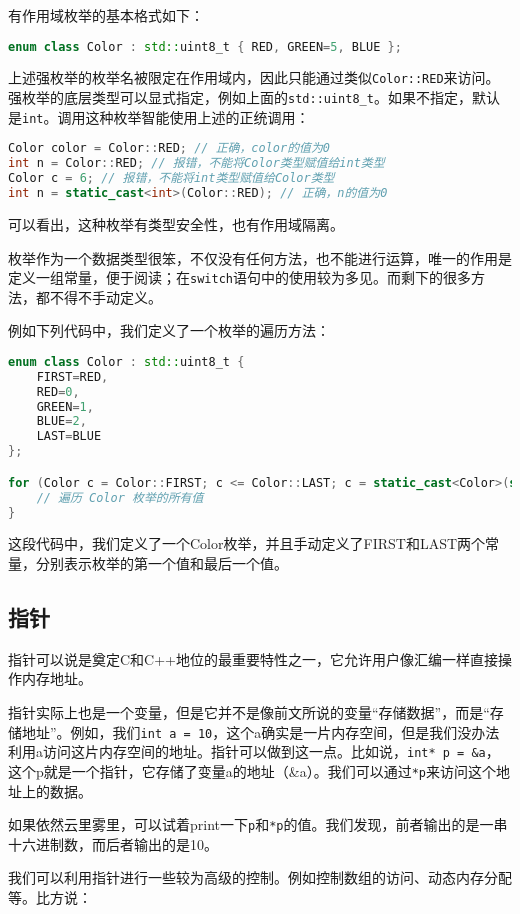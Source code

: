 \documentclass[../main.tex]{subfiles}
\begin{document}
有作用域枚举的基本格式如下：
\begin{lstlisting}[language=C++]
    enum class Color : std::uint8_t { RED, GREEN=5, BLUE };
\end{lstlisting}
上述强枚举的枚举名被限定在作用域内，因此只能通过类似\texttt{Color::RED}来访问。强枚举的底层类型可以显式指定，例如上面的\texttt{std::uint8\_t}。如果不指定，默认是\texttt{int}。调用这种枚举智能使用上述的正统调用：
\begin{lstlisting}[language=C++]
Color color = Color::RED; // 正确，color的值为0
int n = Color::RED; // 报错，不能将Color类型赋值给int类型
Color c = 6; // 报错，不能将int类型赋值给Color类型
int n = static_cast<int>(Color::RED); // 正确，n的值为0
\end{lstlisting}
可以看出，这种枚举有类型安全性，也有作用域隔离。

枚举作为一个数据类型很笨，不仅没有任何方法，也不能进行运算，唯一的作用是定义一组常量，便于阅读；在\texttt{switch}语句中的使用较为多见。而剩下的很多方法，都不得不手动定义。

例如下列代码中，我们定义了一个枚举的遍历方法：
\begin{lstlisting}[language=C++]
enum class Color : std::uint8_t {
    FIRST=RED,
    RED=0,
    GREEN=1,
    BLUE=2,
    LAST=BLUE
};

for (Color c = Color::FIRST; c <= Color::LAST; c = static_cast<Color>(static_cast<int>(c) + 1)) {
    // 遍历 Color 枚举的所有值
}
\end{lstlisting}
这段代码中，我们定义了一个Color枚举，并且手动定义了FIRST和LAST两个常量，分别表示枚举的第一个值和最后一个值。

\subsection{指针}

指针可以说是奠定C和C++地位的最重要特性之一，它允许用户像汇编一样直接操作内存地址。

指针实际上也是一个变量，但是它并不是像前文所说的变量“存储数据”，而是“存储地址”。例如，我们\texttt{int a = 10}，这个a确实是一片内存空间，但是我们没办法利用a访问这片内存空间的地址。指针可以做到这一点。比如说，\texttt{int* p = \&a}，这个p就是一个指针，它存储了变量a的地址（\&a）。我们可以通过\texttt{*p}来访问这个地址上的数据。

如果依然云里雾里，可以试着print一下\texttt{p}和\texttt{*p}的值。我们发现，前者输出的是一串十六进制数，而后者输出的是10。

我们可以利用指针进行一些较为高级的控制。例如控制数组的访问、动态内存分配等。比方说：
\end{document}
